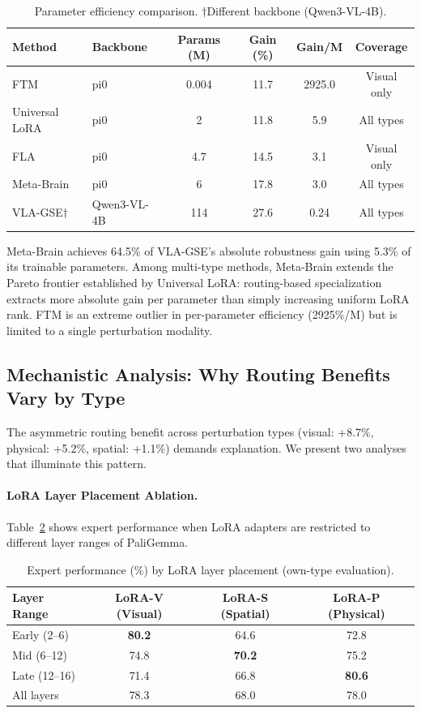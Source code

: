 \documentclass[letterpaper]{article}
\begin{document}
\begin{table}[h]
\centering
\caption{Parameter efficiency comparison. $\dagger$Different backbone (Qwen3-VL-4B).}
\label{tab:param-efficiency}
\small
\begin{tabular}{llcccc}
\toprule
Method & Backbone & Params (M) & Gain (\%) & Gain/M & Coverage \\
\midrule
FTM            & pi0          & 0.004 & 11.7 & 2925.0 & Visual only \\
Universal LoRA & pi0          & 2     & 11.8 & 5.9    & All types \\
FLA            & pi0          & 4.7   & 14.5 & 3.1    & Visual only \\
Meta-Brain     & pi0          & 6     & 17.8 & 3.0    & All types \\
VLA-GSE$\dagger$ & Qwen3-VL-4B & 114   & 27.6 & 0.24   & All types \\
\bottomrule
\end{tabular}
\end{table}

Meta-Brain achieves 64.5\% of VLA-GSE's absolute robustness gain using 5.3\% of its trainable parameters.
Among multi-type methods, Meta-Brain extends the Pareto frontier established by Universal LoRA: routing-based specialization extracts more absolute gain per parameter than simply increasing uniform LoRA rank.
FTM is an extreme outlier in per-parameter efficiency (2925\%/M) but is limited to a single perturbation modality.

\subsection{Mechanistic Analysis: Why Routing Benefits Vary by Type}

The asymmetric routing benefit across perturbation types (visual: +8.7\%, physical: +5.2\%, spatial: +1.1\%) demands explanation.
We present two analyses that illuminate this pattern.

\paragraph{LoRA Layer Placement Ablation.}
Table~\ref{tab:layer-placement} shows expert performance when LoRA adapters are restricted to different layer ranges of PaliGemma.

\begin{table}[h]
\centering
\caption{Expert performance (\%) by LoRA layer placement (own-type evaluation).}
\label{tab:layer-placement}
\small
\begin{tabular}{lccc}
\toprule
Layer Range & LoRA-V (Visual) & LoRA-S (Spatial) & LoRA-P (Physical) \\
\midrule
Early (2--6)   & \textbf{80.2} & 64.6 & 72.8 \\
Mid (6--12)    & 74.8 & \textbf{70.2} & 75.2 \\
Late (12--16)  & 71.4 & 66.8 & \textbf{80.6} \\
All layers     & 78.3 & 68.0 & 78.0 \\
\bottomrule
\end{tabular}
\end{table}
\end{document}
